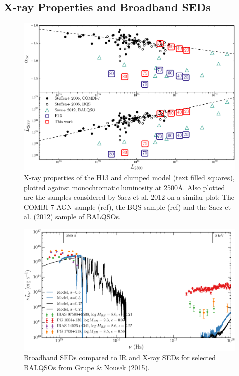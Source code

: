 \documentclass[preprint, a4paper, 11pt]{aastex}
\begin{document}
\subsection{X-ray Properties and Broadband SEDs}

\begin{figure} %
\centering
\includegraphics[width=1.0\textwidth]{figures/alpha_ox_both.eps}
\caption
{
X-ray properties of the H13 and clumped model (text filled 
squares), plotted against monochromatic luminosity 
at 2500\AA. Also plotted are the samples considered by
Saez et al. 2012 on a similar plot; The COMBI-7 AGN sample (ref),
the BQS sample (ref) and the Saez et al. (2012) sample of BALQSOs.
}
\label{fig:xray}
\end{figure} %

\begin{figure} %
\centering
\includegraphics[width=1.0\textwidth]{figures/sed_all_balqsos.eps}
\caption
{
Broadband SEDs compared to IR and X-ray SEDs for selected BALQSOs 
from Grupe \& Nousek (2015).
}
\label{fig:xray}
\end{figure} %
\end{document}
